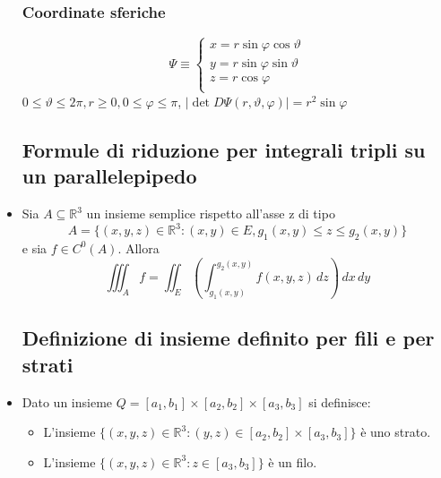 \documentclass{report}
\newcommand{\ace}{\`e }
\newcommand{\Ins}[1]{\mathbb{#1}}
\newcommand{\R}{\Ins{R}}
\newcommand{\abs}[1]{\left\lvert #1 \right\rvert}
\begin{document}
\begin{itemize}
        \subsubsection{Coordinate sferiche}
          $$\Psi \equiv \left\{\begin{array}{l}
            x = r \sin\varphi\cos\vartheta \\
            y = r \sin\varphi\sin\vartheta \\
            z = r \cos\varphi \\
          \end{array}\right.$$
          $0 \leq \vartheta\leq 2\pi, r\geq 0, 0 \leq \varphi \leq \pi$,
          $\abs{\det D\Psi(r,\vartheta,\varphi)} = r^2 \sin\varphi$
    
  \subsection{Formule di riduzione per integrali tripli su un parallelepipedo}
  \item Sia $A\subseteq \R^3$ un insieme semplice rispetto all'asse z di tipo 
        $$A=\{(x,y,z)\in\R^3: (x,y)\in E, g_1(x,y)\leq z \leq g_2(x,y)\}$$
        e sia $f\in C^0(A)$. Allora 
        $$\iiint_{A}f = \iint_{E} \left(\int_{g_1(x,y)}^{g_2(x,y)} f(x,y,z) \,dz\right) \,dx\,dy$$
        
  \subsection{Definizione di insieme definito per fili e per strati}
  \item Dato un insieme $Q = [a_1,b_1] \times [a_2,b_2]\times[a_3,b_3]$ si definisce:
        \begin{itemize}
          \item L'insieme $\{(x,y,z)\in\R^3:(y,z)\in[a_2,b_2]\times[a_3,b_3]\}$ \ace uno strato.
          \item L'insieme $\{(x,y,z)\in\R^3: z\in[a_3,b_3]\}$ \ace un filo.
        \end{itemize}
        

\end{itemize}
\end{document}
